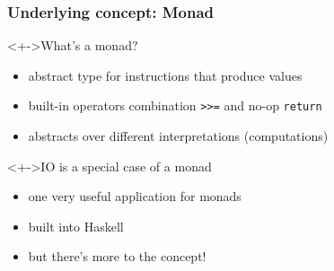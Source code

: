 \documentclass{beamer}
\begin{document}
\begin{frame}
  \frametitle{Underlying concept: \textbf{Monad}}
  \begin{block}<+->{What's a monad?}
    \begin{itemize}
    \item abstract type for instructions that produce values
    \item built-in operators combination \lstinline{>>=} and no-op \lstinline{return}
    \item abstracts over different interpretations (computations)
    \end{itemize}
  \end{block}
  \begin{alertblock}<+->{IO is a special case of a monad}
    \begin{itemize}
    \item one very useful application for monads
    \item built into Haskell
    \item but there's more to the concept!
    \end{itemize}
  \end{alertblock}
\end{frame}
\end{document}
